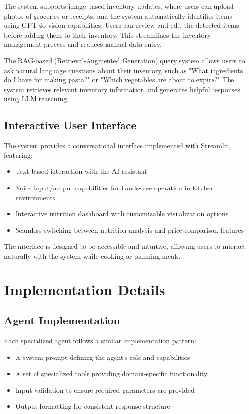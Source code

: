 \documentclass[10pt,twocolumn,letterpaper]{article}
\begin{document}
The system supports image-based inventory updates, where users can upload photos of groceries or receipts, and the system automatically identifies items using GPT-4o vision capabilities. Users can review and edit the detected items before adding them to their inventory. This streamlines the inventory management process and reduces manual data entry.

The RAG-based (Retrieval-Augmented Generation) query system allows users to ask natural language questions about their inventory, such as "What ingredients do I have for making pasta?" or "Which vegetables are about to expire?" The system retrieves relevant inventory information and generates helpful responses using LLM reasoning.

\subsection{Interactive User Interface}

The system provides a conversational interface implemented with Streamlit, featuring:

\begin{itemize}[noitemsep,topsep=0pt]
    \item Text-based interaction with the AI assistant
    \item Voice input/output capabilities for hands-free operation in kitchen environments
    \item Interactive nutrition dashboard with customizable visualization options
    \item Seamless switching between nutrition analysis and price comparison features
\end{itemize}

The interface is designed to be accessible and intuitive, allowing users to interact naturally with the system while cooking or planning meals.

\section{Implementation Details}

\subsection{Agent Implementation}

Each specialized agent follows a similar implementation pattern:

\begin{itemize}[noitemsep,topsep=0pt]
    \item A system prompt defining the agent's role and capabilities
    \item A set of specialized tools providing domain-specific functionality
    \item Input validation to ensure required parameters are provided
    \item Output formatting for consistent response structure
\end{itemize}
\end{document}
